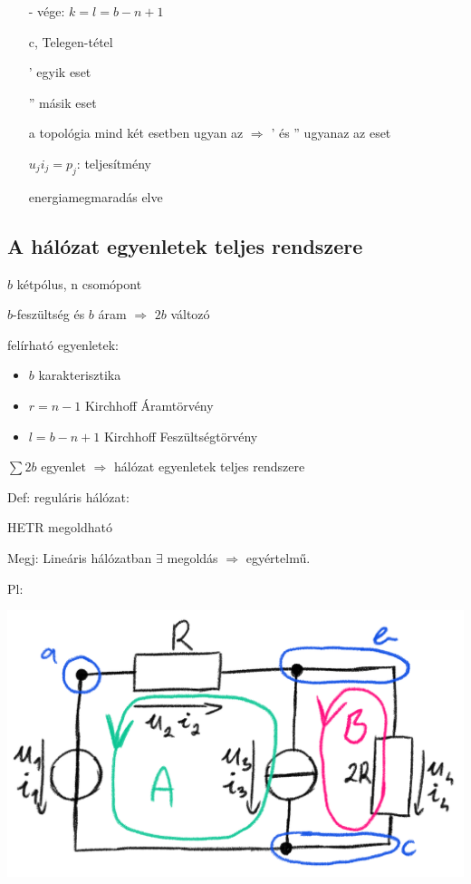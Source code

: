 \documentclass[12pt]{article}
\begin{document}
\begin{itemize}
                    - vége: $k = l = b-n+1$

                \item[c,] Telegen-tétel


                    ' egyik eset 

                    '' másik eset 

                    a topológia mind két esetben ugyan az $\Rightarrow$ ' és '' ugyanaz az eset

                    $u_j i_j = p_j$: teljesítmény

                     energiamegmaradás elve

            \end{itemize}
    \subsection{A hálózat egyenletek teljes rendszere}

        $b$ kétpólus, n csomópont 

        $b$-feszültség és $b$ áram $\Rightarrow$ $2b$ változó

        felírható egyenletek: 
        \begin{itemize}
            \item $b$ karakterisztika
            \item $r=n-1$ Kirchhoff Áramtörvény
            \item $l=b-n+1$ Kirchhoff Feszültségtörvény
        \end{itemize}

        $\sum 2b$ egyenlet $\Rightarrow$ hálózat egyenletek teljes rendszere

        Def: reguláris hálózat: 

        HETR megoldható

        Megj: Lineáris hálózatban $\exists$ megoldás $\Rightarrow$ egyértelmű.

        Pl:  

            \includegraphics{img/10.png}
\end{document}
